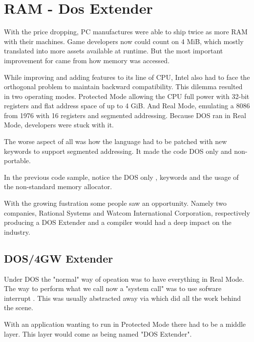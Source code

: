 \section{RAM - Dos Extender}
With the price dropping, PC manufactures were able to ship twice as more RAM with their machines. Game developers now could count on 4 MiB, which mostly translated into more assets available at runtime. But the most important improvement for \doom came from how memory was accessed.\\
\par
While improving and adding features to its line of CPU, Intel also had to face the orthogonal problem to maintain backward compatibility. This dilemma resulted in two operating modes. Protected Mode allowing the CPU full power with 32-bit registers and flat address space of up to 4 GiB. And Real Mode, emulating a 8086 from 1976 with 16 registers and segmented addressing. Because DOS ran in Real Mode, developers were stuck with it.\\
\par
The worse aspect of all was how the language had to be patched with new keywords to support segmented addressing. It made the code DOS only and non-portable.\\
\par
{}
\par
In the previous code sample, notice the DOS only ,  keywords and the usage of the non-standard  memory allocator.\\
\par
With the growing fustration some people saw an opportunity. Namely two companies, Rational Systems and Watcom International Corporation, respectively producing a DOS Extender and a compiler would had a deep impact on the industry.\\
\par


\subsection{DOS/4GW Extender}
Under DOS the "normal" way of opeation was to have everything in Real Mode. The way to perform what we call now a "system call" was to use sofware interrupt . This was usually abstracted away via  which did all the work behind the scene.\\
\par
{}
With an application wanting to run in Protected Mode there had to be a middle layer. This layer would come as being named "DOS Extender".\\


